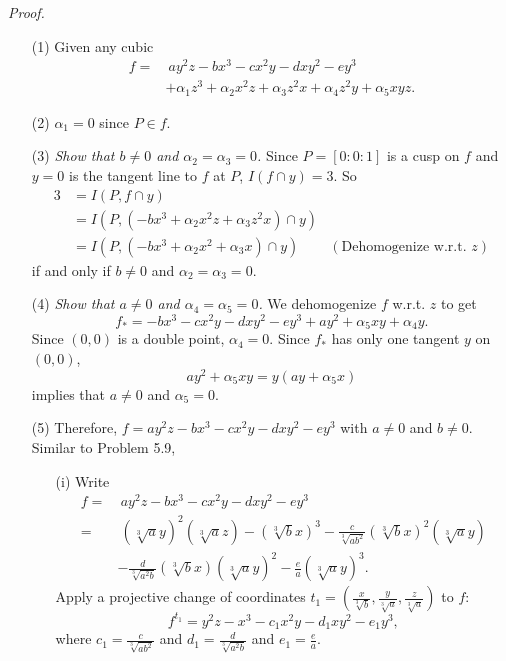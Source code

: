 \documentclass{article}
\begin{document}
\emph{Proof.}
\begin{enumerate}
\item[(1)]
  Given any cubic
  \begin{align*}
    f
    =& \: ay^2z - bx^3 - cx^2y - dxy^2 - ey^3 \\
      & + \alpha_1 z^3 + \alpha_2 x^2 z + \alpha_3 z^2 x + \alpha_4 z^2 y + \alpha_5 xyz.
  \end{align*}

\item[(2)]
  $\alpha_1 = 0$ since $P \in f$.

\item[(3)]
  \emph{Show that $b \neq 0$ and $\alpha_2 = \alpha_3 = 0$.}
  Since $P = [0:0:1]$ is a cusp on $f$ and $y = 0$ is the tangent line to $f$ at $P$,
  $I(f \cap y) = 3$.
  So
  \begin{align*}
    3
    &= I(P, f \cap y) \\
    &= I(P, (-bx^3 + \alpha_2 x^2 z + \alpha_3 z^2 x) \cap y) \\
    &= I(P, (-bx^3 + \alpha_2 x^2 + \alpha_3 x) \cap y)
      &(\text{Dehomogenize w.r.t. $z$})
  \end{align*}
  if and only if $b \neq 0$ and $\alpha_2 = \alpha_3 = 0$.

\item[(4)]
  \emph{Show that $a \neq 0$ and $\alpha_4 = \alpha_5 = 0$.}
  We dehomogenize $f$ w.r.t. $z$ to get
  \[
    f_{*}
    = -bx^3-cx^2y-dxy^2-ey^3 + ay^2 + \alpha_5 xy + \alpha_4 y.
  \]
  Since $(0,0)$ is a double point, $\alpha_4 = 0$.
  Since $f_{*}$ has only one tangent $y$ on $(0,0)$,
  \[
    ay^2 + \alpha_5 xy = y(ay + \alpha_5x)
  \]
  implies that $a \neq 0$ and $\alpha_5 = 0$.

\item[(5)]
  Therefore, $f = ay^2z - bx^3 - cx^2y - dxy^2 - ey^3$ with $a \neq 0$ and $b \neq 0$.
  Similar to Problem 5.9,
  \begin{enumerate}
  \item[(i)]
    Write
    \begin{align*}
      f
      =& \: ay^2z - bx^3 - cx^2y - dxy^2 - ey^3 \\
      =& \: (\sqrt[3]{a}y)^2(\sqrt[3]{a}z)
        - (\sqrt[3]{b}x)^3
        - \frac{c}{\sqrt[3]{ab^2}} (\sqrt[3]{b}x)^2(\sqrt[3]{a}y) \\
        &
        - \frac{d}{\sqrt[3]{a^2 b}} (\sqrt[3]{b}x)(\sqrt[3]{a}y)^2
        - \frac{e}{a} (\sqrt[3]{a}y)^3.
    \end{align*}
    Apply a projective change of coordinates
    $t_1 = \left( \frac{x}{\sqrt[3]{b}}, \frac{y}{\sqrt[3]{a}}, \frac{z}{\sqrt[3]{a}} \right)$
    to $f$:
    \[
      f^{t_1} = y^2z - x^3 - c_1 x^2y - d_1 xy^2 - e_1 y^3,
    \]
    where $c_1 = \frac{c}{\sqrt[3]{ab^2}}$ and
    $d_1 = \frac{d}{\sqrt[3]{a^2 b}}$ and
    $e_1 = \frac{e}{a}$.


\end{enumerate}
\end{enumerate}
\end{document}
